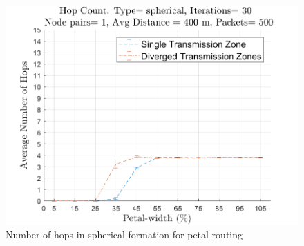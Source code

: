 \begin{figure}[hbtp]
\centering
\includegraphics[width=\simResultFigSize \textwidth,height=0.9\textheight,keepaspectratio]{ncsuthesis-0.6/Chapter-5/figs/pe_hops_spherical.png}
\caption{Number of hops in spherical formation for petal routing}
\label{fig:pe_hops_spherical}
\end{figure}

